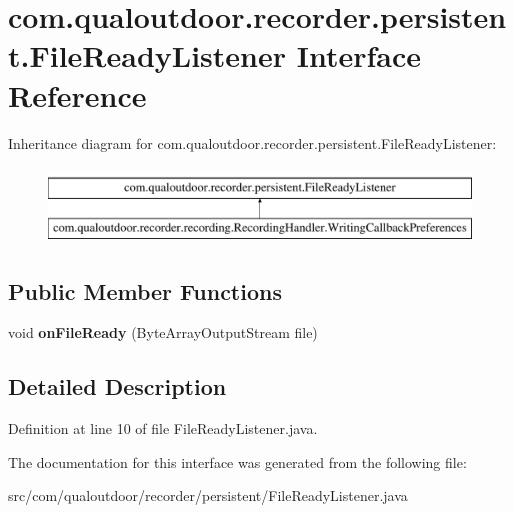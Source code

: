 \hypertarget{interfacecom_1_1qualoutdoor_1_1recorder_1_1persistent_1_1FileReadyListener}{\section{com.\-qualoutdoor.\-recorder.\-persistent.\-File\-Ready\-Listener Interface Reference}
\label{interfacecom_1_1qualoutdoor_1_1recorder_1_1persistent_1_1FileReadyListener}
}
Inheritance diagram for com.\-qualoutdoor.\-recorder.\-persistent.\-File\-Ready\-Listener\-:\begin{figure}[H]
\begin{center}
\leavevmode
\includegraphics[height=2.000000cm]{interfacecom_1_1qualoutdoor_1_1recorder_1_1persistent_1_1FileReadyListener}
\end{center}
\end{figure}
\subsection*{Public Member Functions}
\begin{DoxyCompactItemize}
\item 
\hypertarget{interfacecom_1_1qualoutdoor_1_1recorder_1_1persistent_1_1FileReadyListener_acc7b78d352ead30df4970cb46de56741}{void {\bfseries on\-File\-Ready} (Byte\-Array\-Output\-Stream file)}\label{interfacecom_1_1qualoutdoor_1_1recorder_1_1persistent_1_1FileReadyListener_acc7b78d352ead30df4970cb46de56741}

\end{DoxyCompactItemize}


\subsection{Detailed Description}


Definition at line 10 of file File\-Ready\-Listener.\-java.



The documentation for this interface was generated from the following file\-:\begin{DoxyCompactItemize}
\item 
src/com/qualoutdoor/recorder/persistent/File\-Ready\-Listener.\-java\end{DoxyCompactItemize}
